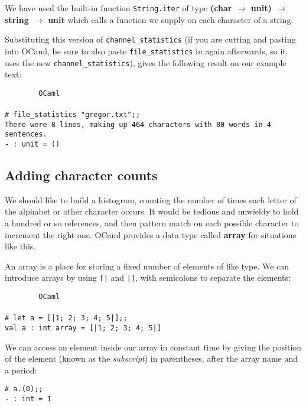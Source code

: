 \documentclass[]{book}
\newcommand{\smspace}{\vspace{4mm}}
\begin{document}
\noindent We have used the built-in function \texttt{String.iter} of type \textsf{\textbf{\textmd{(}char $\rightarrow$ unit\textmd{)} $\rightarrow$ string $\rightarrow$ unit}} which calls a function we supply on each character of a string.

Substituting this version of \texttt{channel\_statistics} (if you are cutting and pasting into OCaml, be sure to also paste \texttt{file\_statistics} in again afterwards, so it uses the new \texttt{channel\_statistics}), gives the following result on our example text:

\smspace
\noindent\verb!        OCaml!\\
\noindent\\
\noindent\verb!# file_statistics "gregor.txt";;!\\
\noindent\verb!There were 8 lines, making up 464 characters with 80 words in 4 sentences.!\\
\noindent\verb!- : unit = ()!
\smspace

\subsection*{Adding character counts}

We should like to build a histogram, counting the number of times each letter of the alphabet or other character occurs. It would be tedious and unwieldy to hold a hundred or so references, and then pattern match on each possible character to increment the right one. OCaml provides a data type called \textsf{\textbf{array}} for situations like this.

An array is a place for storing a fixed number of elements of like type. We can introduce arrays by using \texttt{[|} and \texttt{|]}, with semicolons to separate the elements:

\smspace
\noindent\verb!        OCaml!\\
\noindent\\
\noindent\verb!# let a = [|1; 2; 3; 4; 5|];;!\\
\noindent\verb!val a : int array = [|1; 2; 3; 4; 5|]!
\smspace

\noindent We can access an element inside our array in constant time by giving the position of the element (known as the \textit{subscript}) in parentheses, after the array name and a period:

\smspace
\noindent\verb!# a.(0);;!\\
\noindent\verb!- : int = 1!
\smspace
\end{document}
